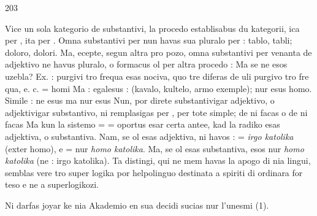 \begin{VUpage}[207]{203}

Vice un sola kategorio de substantivi, la procedo \nl
{} establisabus du kategorii, ica per , ita per .\nl
Omna substantivi per  nun havas sua pluralo per  :\nl
tablo, tabli; doloro, dolori. Ma, ecepte, segun altra pro\cc
pozo, omna substantivi per  venanta de adjektivo ne havus\nl
pluralo, o formacus ol per altra procedo : \nl
Ma se  ne esos uzebla? Ex. : purgivi tro\nl
frequa esas nociva, quo tre diferas de uli purgivo tro fre\cc
qua, e. c.  = homi \nl
{} Ma :  egalesus : \nl
{} (kavalo, kultelo, armo exemple); nur\nl
{} esus homo. Simile : \cc
{} ne esus  ma  nur \cc
{} esus  Nun, por direte substantivigar\nl
adjektivo, o adjektivigar substantivo, ni remplasigas \nl
per ,  per  tote simple; de  ni facas \nl
o de  ni facas  Ma kun la sistemo  = \nl
{} =  oportus esar certa antee, kad la radiko \nl
esas adjektiva, o substantiva. Nam, se ol esas adjektiva, ni\nl
havos :  = \textit{irgo katolika} (exter homo), e  =\nl
nur \textit{homo katolika}. Ma, se ol esas substantiva,  esos\nl
nur \textit{homo katolika} (ne : irgo katolika). Ta distingi, qui ne\nl
mem havas la apogo di nia lingui, semblas vere tro super\cc
logika por helpolinguo destinata a spiriti di ordinara for\cc
teso e ne a superlogikozi.

Ni darfas joyar ke nia Akademio en sua decidi sucias nur\nl
l'unesmi (1).
\end{VUpage}

